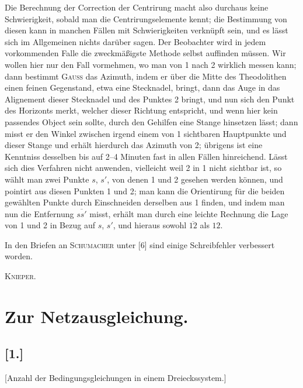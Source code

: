 \documentclass[12pt,a4paper]{article}
\theoremstyle{plain}
\theoremstyle{definition}
\theoremstyle{remark}
\begin{document}
Die Berechnung der Correction der Centrirung macht also durchaus keine Schwierigkeit, sobald man die Centrirungselemente kennt; die Bestimmung von diesen kann in manchen F\"allen mit Schwierigkeiten verkn\"upft sein, und es l\"asst sich im Allgemeinen nichts dar\"uber sagen. Der Beobachter wird in jedem vorkommenden Falle die zweckm\"a\ss{}igste Methode selbst auffinden m\"ussen. Wir wollen hier nur den Fall vormehmen, wo man von 1 nach 2 wirklich messen kann; dann bestimmt \textsc{Gauss} das Azimuth, indem er \"uber die Mitte des Theodolithen einen feinen Gegenstand, etwa eine Stecknadel, bringt, dann das Auge in das Alignement dieser Stecknadel und des Punktes 2 bringt, und nun sich den Punkt des Horizonts merkt, welcher dieser Richtung entspricht, und wenn hier kein passendes Object sein sollte, durch den Gehilfen eine Stange hinsetzen l\"asst; dann misst er den Winkel zwischen irgend einem von 1 sichtbaren Hauptpunkte und dieser Stange und erh\"alt hierdurch das Azimuth von 2; \"ubrigens ist eine Kenntniss desselben bis auf 2--4 Minuten fast in allen F\"allen hinreichend. L\"asst sich dies Verfahren nicht anwenden, vielleicht weil 2 in 1 nicht sichtbar ist, so w\"ahlt man zwei Punkte $s$, $s'$, von denen 1 und 2 gesehen werden k\"onnen, und pointirt aus diesen Punkten 1 und 2; man kann die Orientirung f\"ur die beiden gew\"ahlten Punkte durch Einschneiden derselben aus 1 finden, und indem man nun die Entfernung $\overline{ss'}$ misst, erh\"alt man durch eine leichte Rechnung die Lage von 1 und 2 in Bezug auf $s$, $s'$, und hieraus sowohl $\overline{12}$ als $\mathfrak{12}$.

In den Briefen an \textsc{Schumacher} unter [6] sind einige Schreibfehler verbessert worden.

\hfill\textsc{Knieper.}

\newpage
\section*{Zur Netzausgleichung.}
\label{sec:netzausgleichung}

\subsection*{[1.]}
\label{subsec:netz1}

[Anzahl der Bedingungsgleichungen in einem Dreieckssystem.]
\end{document}
